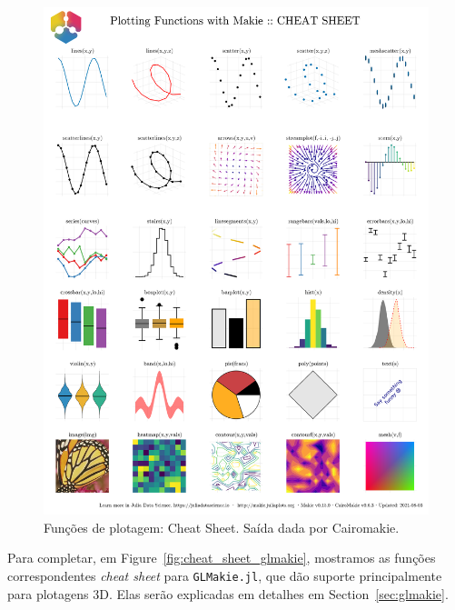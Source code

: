 \documentclass[
  notoc %
]{tufte-book}
\newcommand{\passthrough}[1]{#1}
\begin{document}
\begin{figure}
\hypertarget{fig:cheat_sheet_cairomakie}{%
\centering
\includegraphics{images/makiePlottingFunctionsHide.png}
\caption{Funções de plotagem: Cheat Sheet. Saída dada por
Cairomakie.}\label{fig:cheat_sheet_cairomakie}
}
\end{figure}

Para completar, em Figure~\ref{fig:cheat_sheet_glmakie}, mostramos as
funções correspondentes \emph{cheat sheet} para
\passthrough{\lstinline!GLMakie.jl!}, que dão suporte principalmente
para plotagens 3D. Elas serão explicadas em detalhes em
Section~\ref{sec:glmakie}.
\end{document}
